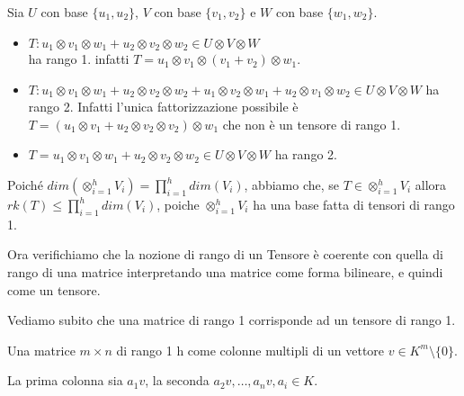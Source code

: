 \documentclass[10pt,a4paper,twoside]{book}
\begin{document}
\begin{example}
    Sia $U$ con base $\{u_1, u_2\}$, $V$ con base $\{v_1, v_2\}$ e $W$ con base $\{w_1, w_2\}$.
    \begin{itemize}
        \item $T: u_1 \otimes v_1 \otimes w_1 + u_2 \otimes v_2 \otimes w_2  \in U \otimes V  \otimes W$\\
              ha rango 1. infatti $T = u_1 \otimes v_1 \otimes (v_1 + v_2 )\otimes w_1$.
        \item $T: u_1 \otimes v_1 \otimes w_1 + u_2 \otimes v_2 \otimes w_2 + u_1 \otimes v_2 \otimes w_1 + u_2 \otimes v_1 \otimes w_2 \in U \otimes V \otimes W$ ha rango 2.
              Infatti l'unica fattorizzazione possibile è $T = (u_1 \otimes v_1  + u_2 \otimes v_2 \otimes v_2) \otimes w_1$ che non è un tensore di rango 1.
        \item $T = u_1 \otimes v_1 \otimes w_1 + u_2 \otimes v_2 \otimes w_2 \in U \otimes V \otimes W $ ha rango 2.
    \end{itemize}
\end{example}

Poiché $dim(\otimes_{i=1}^{h} V_i) = \prod_{i=1}^{h} dim(V_i)$, abbiamo che, se $T \in \otimes_{i=1}^{h} V_i$ allora $rk(T) \leq \prod_{i=1}^{h} dim(V_i)$, poiche $\otimes_{i=1}^{h} V_i$ ha una base fatta di tensori di rango 1.

Ora verifichiamo che la nozione di rango di un Tensore è coerente con quella di rango di una matrice interpretando una matrice come forma bilineare, e quindi come un tensore.

Vediamo subito che una matrice di rango 1 corrisponde ad un tensore di rango 1.

Una matrice $m \times n$ di rango 1 h come colonne multipli di un vettore $v \in K^m \setminus \{0\}$.

La prima colonna sia $a_1v$, la seconda $a_2v, \ldots , a_nv, a_i \in K$.
\end{document}
